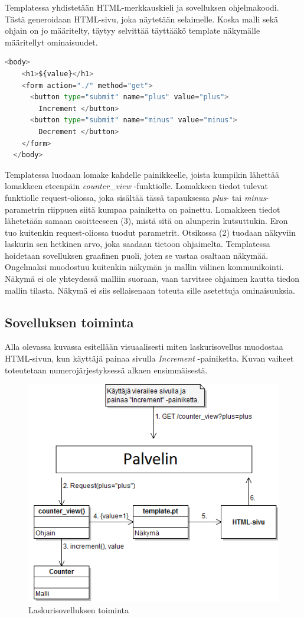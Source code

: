 \documentclass[finnish,utf8,nonumbib,palatino,kandi]{gradu2}
\begin{document}
Templatessa yhdistetään HTML-merkkauskieli ja sovelluksen ohjelmakoodi. Tästä generoidaan HTML-sivu, joka näytetään selaimelle. Koska malli sekä ohjain on jo määritelty, täytyy selvittää täyttääkö template näkymälle määritellyt ominaisuudet.
\begin{lstlisting}[language=Python]
  <body>
    <h1>${value}</h1>
    <form action="./" method="get">
      <button type="submit" name="plus" value="plus">
		Increment </button>
      <button type="submit" name="minus" value="minus"> 
		Decrement </button>
    </form>
  </body>
\end{lstlisting}
Templatessa luodaan lomake kahdelle painikkeelle, joista kumpikin lähettää lomakkeen eteenpäin \emph{counter\_view} -funktiolle. Lomakkeen tiedot tulevat funktiolle request-oliossa, joka sisältää tässä tapauksessa \emph{plus}- tai \emph{minus}-parametrin riippuen siitä kumpaa painiketta on painettu. Lomakkeen tiedot lähetetään samaan osoitteeseen (3), mistä sitä on alunperin kutsuttukin. Eron tuo kuitenkin request-oliossa tuodut parametrit.  Otsikossa (2) tuodaan näkyviin laskurin sen hetkinen arvo, joka saadaan tietoon ohjaimelta.
 Templatessa hoidetaan sovelluksen graafinen puoli, joten se vastaa osaltaan näkymää. \\ Ongelmaksi muodostuu kuitenkin näkymän ja mallin välinen kommunikointi. Näkymä ei ole yhteydessä malliin suoraan, vaan tarvitsee ohjaimen kautta tiedon mallin tilasta.  Näkymä ei siis sellaisenaan toteuta sille asetettuja ominaisuuksia. \\

\subsection{Sovelluksen toiminta}
Alla olevassa kuvassa esitellään visuaalisesti miten laskurisovellus muodostaa HTML-sivun, kun käyttäjä painaa sivulla \emph{Increment} -painiketta. Kuvan
vaiheet toteutetaan numerojärjestyksessä alkaen ensimmäisestä.
\begin{figure}[h]
\centering
\includegraphics[scale=0.87]{laskurisovellus.png}
\caption{Laskurisovelluksen toiminta}
\end{figure}
\newpage
{}
\end{document}
